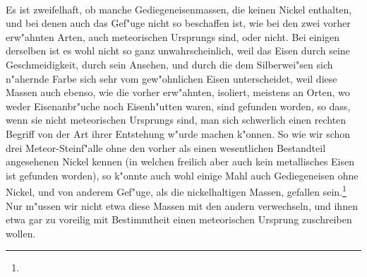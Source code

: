\documentclass[a4paper, 11pt, oneside, polutonikogreek, german]{article}
\begin{document}
\paragraph{}
Es ist zweifelhaft, ob manche Gediegeneisenmassen, die keinen Nickel enthalten, und bei denen auch das Gef"uge nicht so beschaffen ist, wie bei den zwei vorher erw"ahnten Arten, auch meteorischen Ursprungs sind, oder nicht. Bei einigen derselben ist es wohl nicht so ganz unwahrscheinlich, weil das Eisen durch seine Geschmeidigkeit, durch sein Ansehen, und durch die dem Silberwei"sen sich n"ahernde Farbe sich sehr vom gew"ohnlichen Eisen unterscheidet, weil diese Massen auch ebenso, wie die vorher erw"ahnten, isoliert, meistens an Orten, wo weder Eisenanbr"uche noch Eisenh"utten waren, sind gefunden worden, so dass, wenn sie nicht meteorischen Ursprungs sind, man sich schwerlich einen rechten Begriff von der Art ihrer Entstehung w"urde machen k"onnen. So wie wir schon drei Meteor-Steinf"alle ohne den vorher als einen wesentlichen Bestandteil angesehenen Nickel kennen (in welchen freilich aber auch kein metallisches Eisen ist gefunden worden), so k"onnte auch wohl einige Mahl auch Gediegeneisen ohne Nickel, und von anderem Gef"uge, als die nickelhaltigen Massen, gefallen sein.\footnote{} Nur m"ussen wir nicht etwa diese Massen mit den andern verwechseln, und ihnen etwa gar zu voreilig mit Bestimmtheit einen meteorischen Ursprung zuschreiben wollen.
\end{document}
